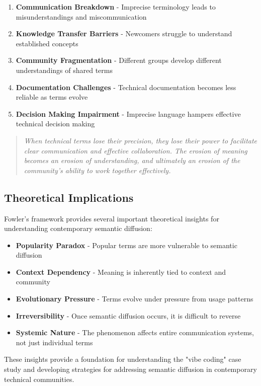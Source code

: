 \documentclass[11pt]{article}
\begin{document}
\begin{enumerate}
\item \textbf{Communication Breakdown} - Imprecise terminology leads to misunderstandings and miscommunication
\item \textbf{Knowledge Transfer Barriers} - Newcomers struggle to understand established concepts
\item \textbf{Community Fragmentation} - Different groups develop different understandings of shared terms
\item \textbf{Documentation Challenges} - Technical documentation becomes less reliable as terms evolve
\item \textbf{Decision Making Impairment} - Imprecise language hampers effective technical decision making
\end{enumerate}

\begin{quote}
\emph{When technical terms lose their precision, they lose their power to facilitate clear communication and effective collaboration. The erosion of meaning becomes an erosion of understanding, and ultimately an erosion of the community's ability to work together effectively.}
\end{quote}

\subsection{Theoretical Implications}

Fowler's framework provides several important theoretical insights for understanding contemporary semantic diffusion:

\begin{itemize}
\item \textbf{Popularity Paradox} - Popular terms are more vulnerable to semantic diffusion
\item \textbf{Context Dependency} - Meaning is inherently tied to context and community
\item \textbf{Evolutionary Pressure} - Terms evolve under pressure from usage patterns
\item \textbf{Irreversibility} - Once semantic diffusion occurs, it is difficult to reverse
\item \textbf{Systemic Nature} - The phenomenon affects entire communication systems, not just individual terms
\end{itemize}

These insights provide a foundation for understanding the "vibe coding" case study and developing strategies for addressing semantic diffusion in contemporary technical communities.
\end{document}
